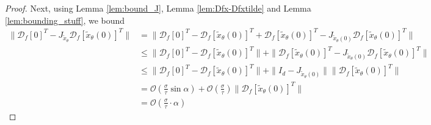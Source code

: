 \documentclass[12pt]{article}
\theoremstyle{remark}
\newcommand{\DD}{\mathcal{D}}
\newcommand{\OO}{\mathcal{O}}
\newcommand{\wtilde}[1]{\widetilde{#1}}
\begin{document}
\begin{appendices}
\begin{proof}
Next, using Lemma \ref{lem:bound_J}, Lemma \ref{lem:Dfx-Dfxtilde} and Lemma \ref{lem:bounding_stuff}, we bound 
\begin{equation}\label{eq:Df-JDfwtilde}
\begin{aligned}
     \|\DD_f[0]^T - J_{\wtilde{x}_\theta} \DD_f[\wtilde{x}_\theta(0)]^T \| &= \|\DD_f[0]^T -\DD_f[\wtilde{x}_\theta(0)]^T+\DD_f[\wtilde{x}_\theta(0)]^T - J_{\wtilde{x}_\theta(0)} \DD_f[\wtilde{x}_\theta(0)]^T \| 
     \\
     &\leq \|\DD_f[0]^T -\DD_f[\wtilde{x}_\theta(0)]^T\|+\|\DD_f[\wtilde{x}_\theta(0)]^T - J_{\wtilde{x}_\theta(0)} \DD_f[\wtilde{x}_\theta(0)]^T \|
     \\
     &\leq \|\DD_f[0]^T -\DD_f[\wtilde{x}_\theta(0)]^T\|+\|I_d - J_{\wtilde{x}_\theta(0)} \|\|\DD_f[\wtilde{x}_\theta(0)]^T \| 
     \\
     &= \OO(\frac{\sigma}{\tau}\sin \alpha) + \OO(\frac{\sigma}{\tau}) \|\DD_f[\wtilde{x}_\theta(0)]^T \|
     \\
     &= \OO(\frac{\sigma}{\tau}\cdot\alpha) 
\end{aligned}
\end{equation}



\end{proof}
\end{appendices}
\end{document}
